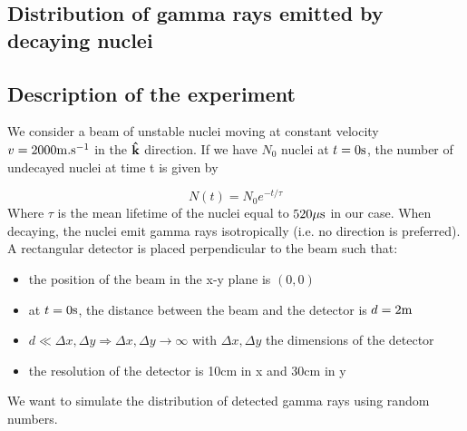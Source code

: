 \documentclass[10 pt]{article}
\numberwithin{equation}{section}
\begin{document}
\begin{multicols}{2}
\section{Distribution of gamma rays emitted by decaying nuclei}
\subsection{Description of the experiment}

We consider a beam of unstable nuclei moving at constant velocity $v= 2000 \rm m.s^{-1}$ in the $\bf \hat k$ direction. If we have $N_0$ nuclei at $t=0 \rm s$, the number of undecayed nuclei at time t is given by\cite{Nuc}

\begin{equation}
N(t) = N_0 e^{-t/\tau}
\end{equation}
Where $\tau$ is the mean lifetime of the nuclei equal to $520 \rm \mu s$ in our case. When decaying, the nuclei emit gamma rays isotropically (i.e. no direction is preferred). A rectangular detector is placed perpendicular to the beam such that:

\begin{itemize}
\item the position of the beam in the x-y plane is $(0,0)$
\item at $t=0 \rm s$, the distance between the beam and the detector is $d = 2 \rm m$
\item $d \ll \Delta x , \Delta y \Rightarrow \Delta x, \Delta y \rightarrow \infty$ with $\Delta x, \Delta y$ the dimensions of the detector
\item the resolution of the detector is 10cm in x and 30cm in y
\end{itemize}

We want to simulate the distribution of detected gamma rays using random numbers.

\end{multicols}
\end{document}
